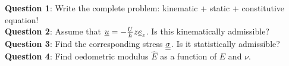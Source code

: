 \documentclass[letter,12pt]{article}
\begin{document}
\noindent \textbf{Question 1}: Write the complete problem: kinematic + static + constitutive equation! \\

\noindent \textbf{Question 2}: Assume that $\underline{u} = - \frac{U}{h} z \underline{e}_z $. Is this kinematically admissible? \\

\noindent \textbf{Question 3}: Find the corresponding stress $\underline{\underline{\sigma}}$. Is it statistically admissible? \\

\noindent \textbf{Question 4}: Find oedometric  modulus $\hat{E}$ as a  function of $E$ and $\nu$.
\end{document}
